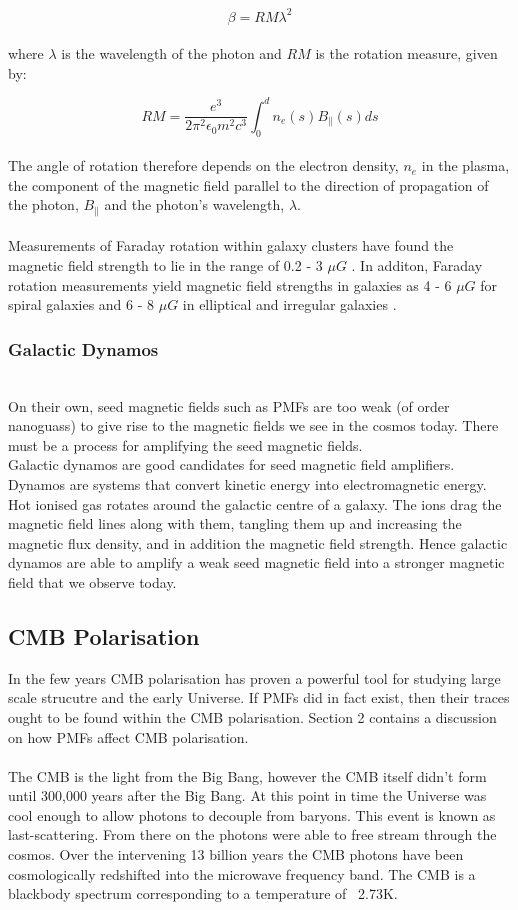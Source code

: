 \begin{equation}
\beta = RM\lambda^2
\end{equation}
\\
where $\lambda$ is the wavelength of the photon and $RM$ is the rotation measure, given by:

\begin{equation}
RM = \frac{e^3}{2\pi ^2 \epsilon_0 m^2 c^3}\int_{0}^{d} n_e(s) B_{\|}(s) ds
\end{equation}
\\
The angle of rotation therefore depends on the electron density, $n_e$ in the plasma, the component of the magnetic field parallel to the direction of propagation of the photon, $B_{\|}$ and the photon's wavelength, $\lambda$.
\\\\
Measurements of Faraday rotation within galaxy clusters have found the magnetic field strength to lie in the range of 0.2 - 3 $\mu G$ \cite{Widrow:2002ud}. In additon, Faraday rotation measurements yield magnetic field strengths in galaxies as 4 - 6 $\mu G$ for spiral galaxies and 6 - 8 $\mu G$ in elliptical and irregular galaxies \cite{Widrow:2002ud}.

\subsubsection*{Galactic Dynamos}
\\
On their own, seed magnetic fields such as PMFs are too weak (of order nanoguass) to give rise to the magnetic fields we see in the cosmos today. There must be a process for amplifying the seed magnetic fields. \\Galactic dynamos are good candidates for seed magnetic field amplifiers. Dynamos are systems that convert kinetic energy into electromagnetic energy. Hot ionised gas rotates around the galactic centre of a galaxy. The ions drag the magnetic field lines along with them, tangling them up and increasing the magnetic flux density, and in addition the magnetic field strength. Hence galactic dynamos are able to amplify a weak seed magnetic field into a stronger magnetic field that we observe today.

\subsection{CMB Polarisation}
In the few years CMB polarisation has proven a powerful tool for studying large scale strucutre and the early Universe. If PMFs did in fact exist, then their traces ought to be found within the CMB polarisation. Section 2 contains a discussion on how PMFs affect CMB polarisation.
\\\\
The CMB is the light from the Big Bang, however the CMB itself didn't form until 300,000 years after the Big Bang. At this point in time the Universe was cool enough to allow photons to decouple from baryons. This event is known as last-scattering. From there on the photons were able to free stream through the cosmos. Over the intervening 13 billion years the CMB photons have been cosmologically redshifted into the microwave frequency band. The CMB is a blackbody spectrum corresponding to a temperature of ~2.73K.


